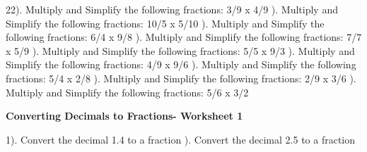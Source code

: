 \documentclass{article}%
\begin{document}
22). Multiply and Simplify the following fractions: 3/9 x 4/9%
\newline%
\newline%
). Multiply and Simplify the following fractions: 10/5 x 5/10%
\newline%
\newline%
). Multiply and Simplify the following fractions: 6/4 x 9/8%
\newline%
\newline%
). Multiply and Simplify the following fractions: 7/7 x 5/9%
\newline%
\newline%
). Multiply and Simplify the following fractions: 5/5 x 9/3%
\newline%
\newline%
). Multiply and Simplify the following fractions: 4/9 x 9/6%
\newline%
\newline%
). Multiply and Simplify the following fractions: 5/4 x 2/8%
\newline%
\newline%
). Multiply and Simplify the following fractions: 2/9 x 3/6%
\newline%
\newline%
). Multiply and Simplify the following fractions: 5/6 x 3/2%
\newline%
\newline%
\newline%
\pagebreak%
\large%
\begin{center}%
\textbf{Converting Decimals to Fractions- Worksheet 1}%
\newline%
\newline%
\newline%
\end{center} \normalsize%
1). Convert the decimal 1.4 to a fraction%
\newline%
\newline%
). Convert the decimal 2.5 to a fraction%
\newline%
\newline%
\end{document}
